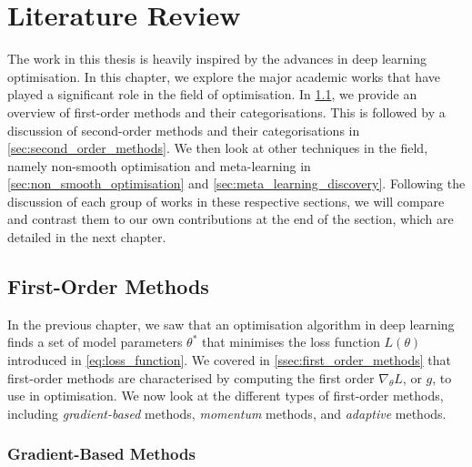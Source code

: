 \chapter{Literature Review}
\label{chap:lit_review}


The work in this thesis is heavily inspired by the advances in deep learning optimisation. In this chapter, we explore the major academic works that have played a significant role in the field of optimisation. In \cref{sec:first_order_methods}, we provide an overview of
first-order methods and their categorisations. This is followed by a discussion of second-order methods and their categorisations in \cref{sec:second_order_methods}. We then look at other techniques in the field, namely non-smooth optimisation and meta-learning in \cref{sec:non_smooth_optimisation} and \cref{sec:meta_learning_discovery}. Following the discussion of each group of works in these respective sections, we will compare and contrast them to our own contributions at the end of the section, which are detailed in the next chapter.

\section{First-Order Methods}
\label{sec:first_order_methods}

In the previous chapter, we saw that an optimisation algorithm in deep learning finds a set of model parameters $\theta^*$ that minimises the loss function $L(\theta)$ introduced in \cref{eq:loss_function}. We covered in \cref{ssec:first_order_methods} that first-order methods are characterised by computing the first order $\nabla_{\theta}L$, or $g$, to use in optimisation. We now look at the different types of first-order methods, including \textit{gradient-based} methods, \textit{momentum} methods, and \textit{adaptive} methods.

\subsection{Gradient-Based Methods}
\label{ssec:gradient_based_methods}

